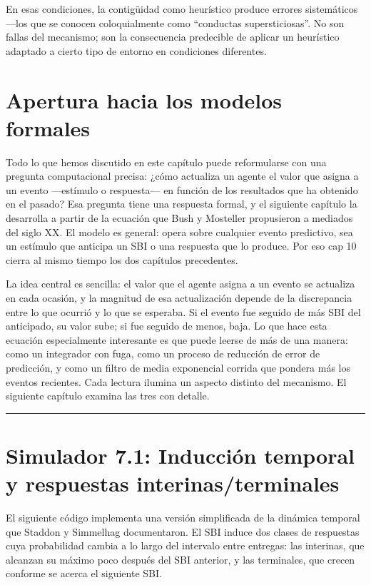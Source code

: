 \documentclass[
  letterpaper,
  DIV=11,
  numbers=noendperiod]{scrreprt}
\begin{document}
\begin{tcolorbox}[enhanced jigsaw, toprule=.15mm, arc=.35mm, colback=white, opacityback=0, colframe=quarto-callout-note-color-frame, breakable, rightrule=.15mm, left=2mm, leftrule=.75mm, bottomrule=.15mm]
En esas condiciones, la contigüidad como heurístico produce errores
sistemáticos ---los que se conocen coloquialmente como ``conductas
supersticiosas''. No son fallas del mecanismo; son la consecuencia
predecible de aplicar un heurístico adaptado a cierto tipo de entorno en
condiciones diferentes.

\section{Apertura hacia los modelos
formales}\label{apertura-hacia-los-modelos-formales}

Todo lo que hemos discutido en este capítulo puede reformularse con una
pregunta computacional precisa: ¿cómo actualiza un agente el valor que
asigna a un evento ---estímulo o respuesta--- en función de los
resultados que ha obtenido en el pasado? Esa pregunta tiene una
respuesta formal, y el siguiente capítulo la desarrolla a partir de la
ecuación que Bush y Mosteller propusieron a mediados del siglo XX. El
modelo es general: opera sobre cualquier evento predictivo, sea un
estímulo que anticipa un SBI o una respuesta que lo produce. Por eso cap
10 cierra al mismo tiempo los dos capítulos precedentes.

La idea central es sencilla: el valor que el agente asigna a un evento
se actualiza en cada ocasión, y la magnitud de esa actualización depende
de la discrepancia entre lo que ocurrió y lo que se esperaba. Si el
evento fue seguido de más SBI del anticipado, su valor sube; si fue
seguido de menos, baja. Lo que hace esta ecuación especialmente
interesante es que puede leerse de más de una manera: como un integrador
con fuga, como un proceso de reducción de error de predicción, y como un
filtro de media exponencial corrida que pondera más los eventos
recientes. Cada lectura ilumina un aspecto distinto del mecanismo. El
siguiente capítulo examina las tres con detalle.

\begin{center}\rule{0.5\linewidth}{0.5pt}\end{center}

\section{Simulador 7.1: Inducción temporal y respuestas
interinas/terminales}\label{simulador-7.1-inducciuxf3n-temporal-y-respuestas-interinasterminales}

El siguiente código implementa una versión simplificada de la dinámica
temporal que Staddon y Simmelhag documentaron. El SBI induce dos clases
de respuestas cuya probabilidad cambia a lo largo del intervalo entre
entregas: las interinas, que alcanzan su máximo poco después del SBI
anterior, y las terminales, que crecen conforme se acerca el siguiente
SBI.


\end{tcolorbox}
\end{document}
